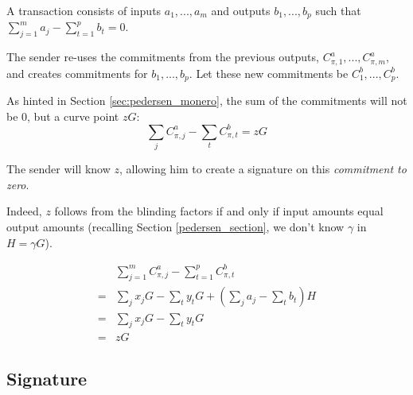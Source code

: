 A transaction consists of inputs \(a_1, ..., a_m\) and outputs \(b_1, ..., b_p\) such that \(\sum\limits_{j=1}^m a_j - \sum\limits_{t=1}^p b_t = 0\). 
 
The sender re-uses the commitments from the previous outputs, $C_{\pi,1}^a, ..., C_{\pi,m}^a,$ and creates commitments for $b_1, ..., b_p$. Let these new commitments be $C_1^b, ..., C_p^b$.

As hinted in Section \ref{sec:pedersen_monero}, the sum of the commitments will not be 0, but a curve point $z G$:\\
\[\sum\limits_j C^a_{\pi, j} -\sum\limits_t C^b_{\pi, t} = z G  \]

The sender will know $z$, allowing him to create a signature on this {\em commitment to zero}. 

Indeed, $z$ follows from the blinding factors if and only if input amounts equal output amounts (recalling Section \ref{pedersen_section}, we don’t know $\gamma$ in $H = \gamma G$).


\begin{align*}
& \sum\limits_{j=1}^m C^a_{\pi, j} - \sum\limits_{t=1}^p C^b_{\pi, t} \\
= & \sum\limits_j x_j G - \sum\limits_t y_t G + (\sum\limits_j  a_j - \sum\limits_t  b_t) H\\
= & \sum\limits_j x_j G - \sum\limits_t y_t G \\
= & z G
\end{align*}




\subsection{Signature}
\label{full-signature}



